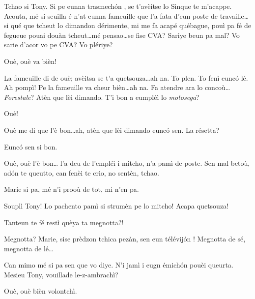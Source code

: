 \begin{drama}

\Turispeaks{} Tchao si Tony. Si pe eunna trasmech\'on , se t'avèitse lo Sinque te m'acappe. Acouta, mé si seuilla é n'at eunna fameuille que l'a fata d'eun poste de travaille\ldots si qué que tcheut lo dimandon dérimente, mi me fa acapé québague, pouì pa fé de fegueue pouai douàn tcheut\ldots mé pensao\ldots se fise CVA? Sariye beun pa mal?  Vo sarie d'acor vo pe CVA? Vo plériye?


\Tanteunspeaks Ouè, ouè va bièn!

\Turispeaks{} La fameuille di de ouè; avèitsa se t'a quetsouza\ldots ah na. To plen. To fenì eunc\'o lé. Ah pompì! Pe la fameuille va cheur bièn\ldots ah na. Fa atendre ara lo concoù\ldots \textit{Forestale}? Atèn que lèi dimando.  T'i bon a eumpléì lo \textit{motosega}?

\Twitterspeaks{} Ouè!

\Turispeaks{} Ouè me di que l'è bon\ldots ah, atèn que lèi dimando eunc\'o sen.  La résetta?

\Twitterspeaks{} Eunc\'o sen si bon.

\Turispeaks{} Ouè, ouè l'è bon\ldots {} l'a deu de l'empléì i mitcho, n'a pamì de poste.  Sen mal betoù, ad\'on te queutto, can fenèi te crio, no sentèn, tchao.


\Turispeaks Marie si pa, mé n'i prooù de tot, mi n'en pa.

\Ipadspeaks Souplì Tony! Lo pachento pamì si strumèn pe lo mitcho! Acapa quetsouza!

\Alicespeaks{} Tanteun te fé restì quèya ta megnotta?!

\Turispeaks Megnotta? Marie, sise prèdzon tchica pezàn, sen eun télévij\'on ! Megnotta de sé, megnotta de lé\ldots


\Mariespeaks Can mimo mé si pa sen que vo diye. N'i jamì i eugn émich\'on pouèi queurta. Mesieu Tony, vouillade le-z-ambrachì?

\Turispeaks Ouè, ouè bièn volontchì.


\end{drama}
